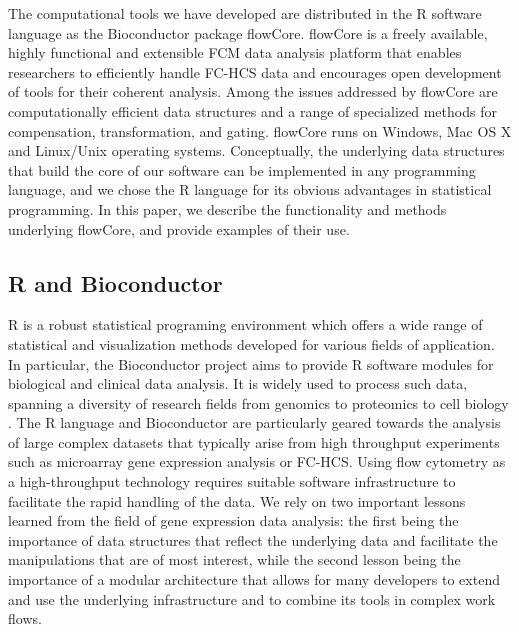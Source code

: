 \documentclass[12pt]{article}
\begin{document}
The computational tools we have developed are distributed in the R
software language as the Bioconductor package flowCore. flowCore is a
freely available, highly functional and extensible FCM data analysis
platform that enables researchers to efficiently handle FC-HCS data
and encourages open development of tools for their coherent
analysis. Among the issues addressed by flowCore are computationally
efficient data structures and a range of specialized methods for
compensation, transformation, and gating.  flowCore runs on Windows,
Mac OS X and Linux/Unix operating systems. Conceptually, the
underlying data structures that build the core of our software can be
implemented in any programming language, and we chose the R language
for its obvious advantages in statistical programming. In this paper,
we describe the functionality and methods underlying flowCore, and
provide examples of their use.


\subsection*{R and Bioconductor}
R is a robust statistical programing environment which offers a wide
range of statistical and visualization methods developed for various
fields of application. In particular, the Bioconductor project aims to
provide R software modules for biological and clinical data analysis.
It is widely used to process such data, spanning a diversity of
research fields from genomics to proteomics to cell biology
\citep{gentleman2006bos}. The R language and Bioconductor are
particularly geared towards the analysis of large complex datasets
that typically arise from high throughput experiments such as
microarray gene expression analysis or FC-HCS. Using flow cytometry as
a high-throughput technology requires suitable software infrastructure
to facilitate the rapid handling of the data. We rely on two important
lessons learned from the field of gene expression data analysis: the
first being the importance of data structures that reflect the
underlying data and facilitate the manipulations that are of most
interest, while the second lesson being the importance of a modular
architecture that allows for many developers to extend and use the
underlying infrastructure and to combine its tools in complex
work flows.
\end{document}
